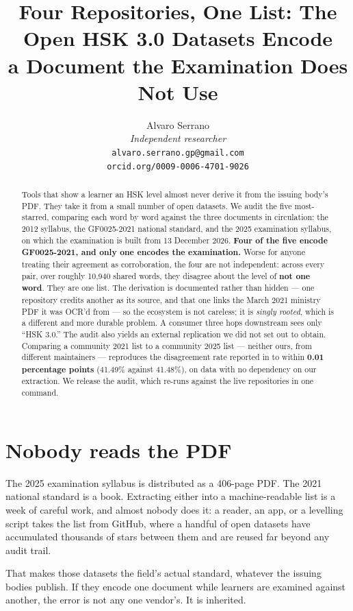 \documentclass[11pt]{article}
\title{Four Repositories, One List: The Open HSK 3.0 Datasets Encode\\
       a Document the Examination Does Not Use}
\author{Alvaro Serrano \\
  \textit{Independent researcher} \\
  \texttt{alvaro.serrano.gp@gmail.com} \\
  \texttt{orcid.org/0009-0006-4701-9026}}
\begin{document}
\maketitle

\begin{abstract}
Tools that show a learner an HSK level almost never derive it from the issuing
body's PDF. They take it from a small number of open datasets. We audit the five
most-starred, comparing each word by word against the three documents in
circulation: the 2012 syllabus, the GF0025-2021 national standard, and the 2025
examination syllabus, on which the examination is built from 13 December 2026.
\textbf{Four of the five encode
GF0025-2021, and only one encodes the examination.} Worse for anyone treating
their agreement as corroboration, the four are not independent: across every
pair, over roughly 10{,}940 shared words, they disagree about the level of
\textbf{not one word}. They are one list. The derivation is documented rather
than hidden --- one repository credits another as its source, and that one links
the March 2021 ministry PDF it was OCR'd from --- so the ecosystem is not
careless; it is \emph{singly rooted}, which is a different and more durable
problem. A consumer three hops downstream sees only ``HSK 3.0.'' The audit also yields
an external replication we did not set out to obtain. Comparing a community 2021
list to a community 2025 list --- neither ours, from different maintainers ---
reproduces the disagreement rate reported in \citet{serrano2026whichhsk} to
within \textbf{0.01 percentage points} (41.49\% against 41.48\%), on data with no
dependency on our extraction. We release the audit, which re-runs against the
live repositories in one command.
\end{abstract}

\section{Nobody reads the PDF}

The 2025 examination syllabus is distributed as a 406-page PDF. The 2021
national standard is a book. Extracting either into a machine-readable list is a
week of careful work, and almost nobody does it: a reader, an app, or a
levelling script takes the list from GitHub, where a handful of open datasets
have accumulated thousands of stars between them and are reused far beyond any
audit trail.

That makes those datasets the field's actual standard, whatever the issuing
bodies publish. If they encode one document while learners are examined against
another, the error is not any one vendor's. It is inherited.
\end{document}
